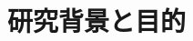 \documentclass[a4jsme,dvipdfmx]{jarticle}
\date{令和4年2月7日}
\begin{document}
\maketitle
\thispagestyle{fancy}
\renewcommand{\headrulewidth}{0pt}
\cfoot{}
\small{}
\section{研究背景と目的}
\end{document}
